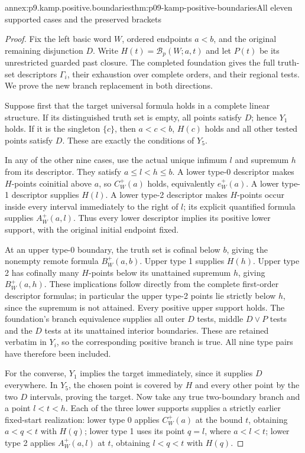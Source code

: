 \begin{annexitem}{annex:p9.kamp.positive.boundaries}{thm:p09-kamp-positive-boundaries}{All eleven supported cases and the preserved brackets}
\begin{proof}
Fix the left basic word \(W\), ordered endpoints \(a<b\),
and the original remaining disjunction \(D\). Write
\(H(t)=\mathcal B_p(W;a,t)\) and let \(P(t)\) be
its unrestricted guarded past closure. The completed foundation
gives the full truth-set descriptors \(\Gamma_i\), their
exhaustion over complete orders, and their regional tests.
We prove the new branch replacement in both directions.

Suppose first that the target universal formula holds in a complete
linear structure. If its distinguished truth set is empty, all
points satisfy \(D\); hence \(Y_1\) holds. If it is
the singleton \(\{c\}\), then \(a<c<b\), \(H(c)\)
holds and all other tested points satisfy \(D\). These are
exactly the conditions of \(Y_5\).

In any of the other nine cases, use the actual unique infimum
\(l\) and supremum \(h\) from its descriptor. They satisfy
\(a\leq l<h\leq b\). A lower type-0 descriptor makes
\(H\)-points coinitial above \(a\), so \(C_W^+(a)\)
holds, equivalently \(e_W^+(a)\). A lower type-1 descriptor
supplies \(H(l)\). A lower type-2 descriptor makes
\(H\)-points occur inside every interval immediately to the
right of \(l\); its explicit quantified formula supplies
\(A_W^+(a,l)\). Thus every lower descriptor implies its
positive lower support, with the original initial endpoint fixed.

At an upper type-0 boundary, the truth set is cofinal below \(b\),
giving the nonempty remote formula \(B_W^+(a,b)\).
Upper type 1 supplies \(H(h)\). Upper type 2 has cofinally
many \(H\)-points below its unattained supremum \(h\),
giving \(B_W^+(a,h)\). These implications follow directly
from the complete first-order descriptor formulas; in particular
the upper type-2 points lie strictly below \(h\), since
the supremum is not attained. Every positive upper support holds.
The foundation's branch equivalence supplies all outer \(D\)
tests, middle \(D\lor P\) tests and the \(D\) tests
at its unattained interior boundaries. These are retained verbatim
in \(Y_i\), so the corresponding positive branch is true.
All nine type pairs have therefore been included.

For the converse, \(Y_1\) implies the target immediately,
since it supplies \(D\) everywhere. In \(Y_5\), the
chosen point is covered by \(H\) and every other point by
the two \(D\) intervals, proving the target.
Now take any true two-boundary branch and a point \(l<t<h\).
Each of the three lower supports supplies a strictly earlier
fixed-start realization: lower type 0 applies \(C_W^+(a)\)
at the bound \(t\), obtaining \(a<q<t\) with \(H(q)\);
lower type 1 uses its point \(q=l\), where \(a<l<t\);
lower type 2 applies \(A_W^+(a,l)\) at \(t\), obtaining
\(l<q<t\) with \(H(q)\).


\end{proof}
\end{annexitem}
